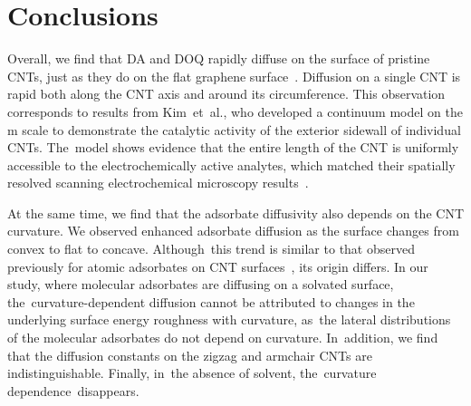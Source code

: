 \documentclass[molecules,article,accept,pdftex,moreauthors]{Definitions/mdpi}
\begin{document}
\section{Conclusions}

Overall, we find that DA and DOQ rapidly diffuse on the surface of pristine CNTs, just as they do on the flat graphene surface~\cite{Jia2022}. Diffusion on a single CNT is rapid both along the CNT axis and around its circumference. This observation corresponds to results from Kim~et~al., who developed a continuum model on the \textmu m scale to demonstrate the catalytic activity of the exterior sidewall of individual CNTs. The~model shows evidence that the entire length of the CNT is uniformly accessible to the electrochemically active analytes, which matched their spatially resolved scanning electrochemical microscopy results~\cite{ac2010kim}.  	

At the same time, we find that the adsorbate diffusivity also depends on the CNT curvature. We observed enhanced adsorbate diffusion as the surface changes from convex to flat to concave. Although~this trend is similar to that observed previously for atomic adsorbates on CNT surfaces~\cite{Shu2001, Liu2013}, its origin differs. 
In our study, where molecular adsorbates are diffusing on a solvated surface, the~curvature-dependent diffusion cannot be attributed to changes in the underlying surface energy roughness with curvature, as~the lateral distributions of the molecular adsorbates do not depend on curvature. In~addition, we find that the diffusion constants on the zigzag and armchair CNTs are indistinguishable. Finally, in~the absence of solvent, the~curvature dependence~disappears.
\end{document}
